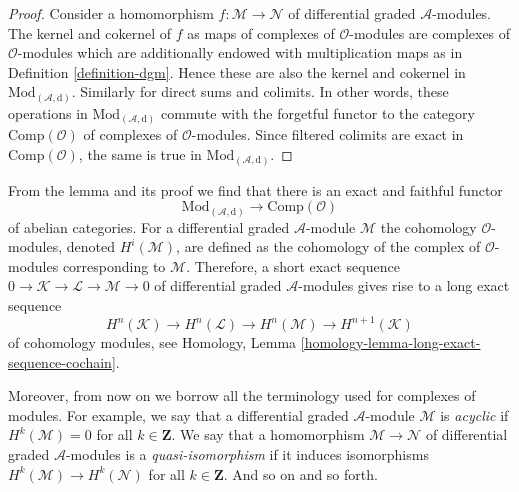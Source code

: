 \begin{proof}
Consider a homomorphism $f : \mathcal{M} \to \mathcal{N}$
of differential graded $\mathcal{A}$-modules. The kernel
and cokernel of $f$ as maps of complexes of $\mathcal{O}$-modules
are complexes of $\mathcal{O}$-modules which are additionally
endowed with multiplication maps as in
Definition \ref{definition-dgm}. Hence these are also
the kernel and cokernel in $\text{Mod}_{(\mathcal{A}, \text{d})}$.
Similarly for direct sums and colimits. In other words, these operations
in $\text{Mod}_{(\mathcal{A}, \text{d})}$ commute with the
forgetful functor to the category $\text{Comp}(\mathcal{O})$
of complexes of $\mathcal{O}$-modules. Since filtered colimits
are exact in $\text{Comp}(\mathcal{O})$, the same is true in
$\text{Mod}_{(\mathcal{A}, \text{d})}$.
\end{proof}

\noindent
From the lemma and its proof we find that there is an exact
and faithful functor
$$
\text{Mod}_{(\mathcal{A}, \text{d})} \longrightarrow \text{Comp}(\mathcal{O})
$$
of abelian categories. For a differential graded $\mathcal{A}$-module
$\mathcal{M}$ the cohomology $\mathcal{O}$-modules, denoted $H^i(\mathcal{M})$,
are defined as the cohomology of the complex of
$\mathcal{O}$-modules corresponding to $\mathcal{M}$.
Therefore, a short exact sequence 
$0 \to \mathcal{K} \to \mathcal{L} \to \mathcal{M} \to 0$
of differential graded $\mathcal{A}$-modules
gives rise to a long exact sequence
\begin{equation}
\label{equation-les}
H^n(\mathcal{K}) \to H^n(\mathcal{L}) \to H^n(\mathcal{M}) \to
H^{n + 1}(\mathcal{K})
\end{equation}
of cohomology modules, see
Homology, Lemma \ref{homology-lemma-long-exact-sequence-cochain}.

\medskip\noindent
Moreover, from now on we borrow all the terminology used for
complexes of modules. For example, we say that a differential
graded $\mathcal{A}$-module $\mathcal{M}$ is {\it acyclic} if
$H^k(\mathcal{M}) = 0$ for all $k \in \mathbf{Z}$. We say that a
homomorphism $\mathcal{M} \to \mathcal{N}$
of differential graded $\mathcal{A}$-modules is a {\it quasi-isomorphism}
if it induces isomorphisms $H^k(\mathcal{M}) \to H^k(\mathcal{N})$
for all $k \in \mathbf{Z}$. And so on and so forth.


















